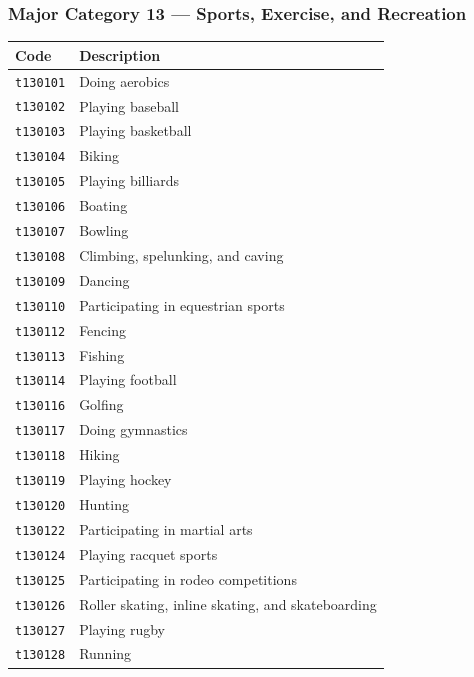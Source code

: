 \documentclass[11pt, a4paper]{article}
\begin{document}
\vspace{6cm}
\subsubsection*{Major Category 13 --- Sports, Exercise, and Recreation}
\begin{longtable}{L{3cm} L{13cm}}
\toprule \textbf{Code} & \textbf{Description} \\ \midrule \endhead
\bottomrule \endfoot
\texttt{t130101} & Doing aerobics \\
 \texttt{t130102} & Playing baseball \\
\texttt{t130103} & Playing basketball \\
 \texttt{t130104} & Biking \\
\texttt{t130105} & Playing billiards \\
 \texttt{t130106} & Boating \\
\texttt{t130107} & Bowling \\
 \texttt{t130108} & Climbing, spelunking, and caving \\
\texttt{t130109} & Dancing \\
 \texttt{t130110} & Participating in equestrian sports \\
\texttt{t130112} & Fencing \\
 \texttt{t130113} & Fishing \\
\texttt{t130114} & Playing football \\
 \texttt{t130116} & Golfing \\
\texttt{t130117} & Doing gymnastics \\
 \texttt{t130118} & Hiking \\
\texttt{t130119} & Playing hockey \\
 \texttt{t130120} & Hunting \\
\texttt{t130122} & Participating in martial arts \\
 \texttt{t130124} & Playing racquet sports \\
\texttt{t130125} & Participating in rodeo competitions \\
 \texttt{t130126} & Roller skating, inline skating, and skateboarding \\
\texttt{t130127} & Playing rugby \\
 \texttt{t130128} & Running \\

\end{longtable}
\end{document}
